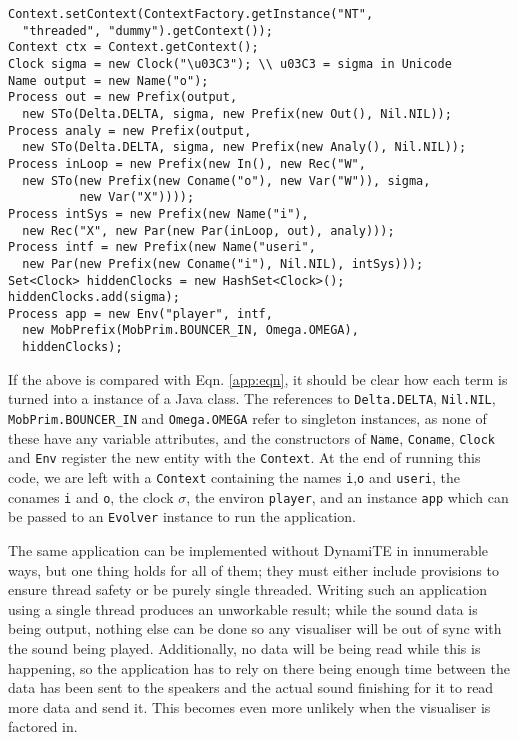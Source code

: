 \begin{verbatim}
Context.setContext(ContextFactory.getInstance("NT",
  "threaded", "dummy").getContext());
Context ctx = Context.getContext();
Clock sigma = new Clock("\u03C3"); \\ u03C3 = sigma in Unicode
Name output = new Name("o");
Process out = new Prefix(output,
  new STo(Delta.DELTA, sigma, new Prefix(new Out(), Nil.NIL));
Process analy = new Prefix(output,
  new STo(Delta.DELTA, sigma, new Prefix(new Analy(), Nil.NIL));
Process inLoop = new Prefix(new In(), new Rec("W",
  new STo(new Prefix(new Coname("o"), new Var("W")), sigma,
          new Var("X"))));
Process intSys = new Prefix(new Name("i"),
  new Rec("X", new Par(new Par(inLoop, out), analy)));
Process intf = new Prefix(new Name("useri",
  new Par(new Prefix(new Coname("i"), Nil.NIL), intSys)));
Set<Clock> hiddenClocks = new HashSet<Clock>();
hiddenClocks.add(sigma);
Process app = new Env("player", intf,
  new MobPrefix(MobPrim.BOUNCER_IN, Omega.OMEGA),
  hiddenClocks);
\end{verbatim}

If the above is compared with Eqn. \ref{app:eqn}, it should be clear
how each term is turned into a instance of a Java class.  The
references to \texttt{Delta.DELTA}, \texttt{Nil.NIL},
\texttt{MobPrim.BOUNCER\_IN} and \texttt{Omega.OMEGA} refer to
singleton instances, as none of these have any variable attributes,
and the constructors of \texttt{Name}, \texttt{Coname}, \texttt{Clock}
and \texttt{Env} register the new entity with the \texttt{Context}.
At the end of running this code, we are left with a \texttt{Context}
containing the names \texttt{i},\texttt{o} and \texttt{useri}, the
conames \texttt{i} and \texttt{o}, the clock $\sigma$, the environ
\texttt{player}, and an instance \texttt{app} which can be passed to
an \texttt{Evolver} instance to run the application.

The same application can be implemented without DynamiTE in
innumerable ways, but one thing holds for all of them; they must
either include provisions to ensure thread safety or be purely single
threaded.  Writing such an application using a single thread produces
an unworkable result; while the sound data is being output, nothing
else can be done so any visualiser will be out of sync with the sound
being played.  Additionally, no data will be being read while this is
happening, so the application has to rely on there being enough time
between the data has been sent to the speakers and the actual sound
finishing for it to read more data and send it.  This becomes even
more unlikely when the visualiser is factored in.

